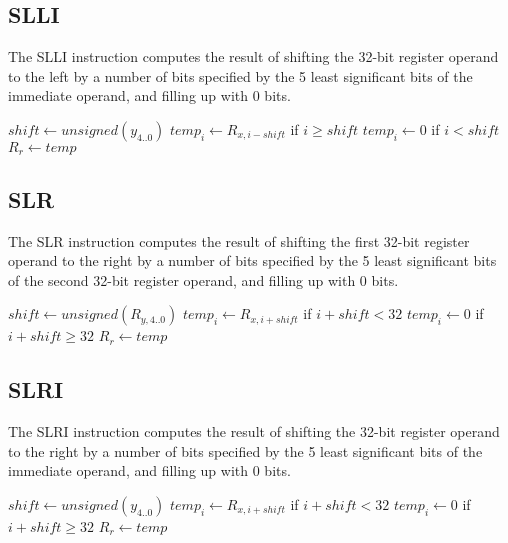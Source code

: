 \subsection{SLLI}

The SLLI instruction computes the result of shifting the 32-bit register operand to the left by a number of bits specified by the 5 least significant bits of the immediate operand, and filling up with 0 bits.\\


\begin{effectize}
\effect $shift \leftarrow unsigned(y_{4..0})$
\effect $temp_i \leftarrow R_{x,i-shift}$ if $i \geq shift$
\effect $temp_i \leftarrow 0$ if $i < shift$
\effect $R_r \leftarrow temp$
\end{effectize}

\subsection{SLR}

The SLR instruction computes the result of shifting the first 32-bit register operand to the right by a number of bits specified by the 5 least significant bits of the second 32-bit register operand, and filling up with 0 bits.\\


\begin{effectize}
\effect $shift \leftarrow unsigned(R_{y,4..0})$
\effect $temp_i \leftarrow R_{x,i+shift}$ if $i + shift < 32$
\effect $temp_i \leftarrow 0$ if $i + shift \geq 32$
\effect $R_r \leftarrow temp$
\end{effectize}

\subsection{SLRI}

The SLRI instruction computes the result of shifting the 32-bit register operand to the right by a number of bits specified by the 5 least significant bits of the immediate operand, and filling up with 0 bits.\\


\begin{effectize}
\effect $shift \leftarrow unsigned(y_{4..0})$
\effect $temp_i \leftarrow R_{x,i+shift}$ if $i + shift < 32$
\effect $temp_i \leftarrow 0$ if $i + shift \geq 32$
\effect $R_r \leftarrow temp$
\end{effectize}

